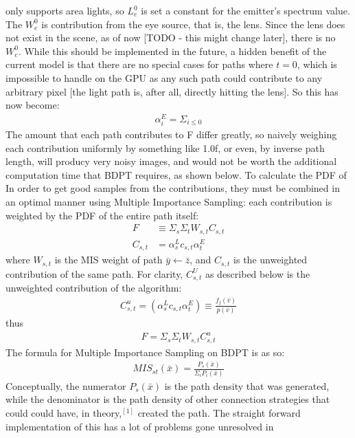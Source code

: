 \documentclass{article}
\begin{document}
only supports area lights, so $L^0_e$ is set a constant for the emitter's
spectrum value. The $W_e^0$ is contribution from the eye source, that is, the
lens. Since the lens does not exist in the scene, as of now [TODO - this might
change later], there is no $W_e^0$. While this should be implemented in the
future, a hidden benefit of the current model is that there are no special cases
for paths where $t = 0$, which is impossible to handle on the GPU as any such
path could contribute to any arbitrary pixel [the light path is, after all,
directly hitting the lens]. So this has now become:
  \begin{align}
    \alpha_i^E = \Sigma_{i\leq 0} 
  \end{align}
  The amount that each path contributes to F differ greatly, so naively weighing
each contribution uniformly by something like 1.0f, or even, by inverse path
length, will producy very noisy images, and would not be worth the additional
computation time that BDPT requires, as shown below. To calculate the PDF of In
order to get good samples from the contributions, they must be combined in an
optimal manner using Multiple Importance Sampling: each contribution is weighted
by the PDF of the entire path itself:
  \begin{align*}
    F &\equiv \Sigma_s\Sigma_tW_{s, t}C_{s, t}\\
    C_{s, t} &= \alpha^L_s c_{s, t} \alpha^E_t
  \end{align*}
    where $W_{s, t}$ is the MIS weight of path $\bar{y} \leftarrow \bar{z}$, and
$C_{s, t}$ is the unweighted contribution of the same path. For clarity,
$C^U_{s, t}$ as described below is the unweighted contribution of the
    algorithm:
  \begin{align}
    C^u_{s, t} = (\alpha^L_s c_{s, t} \alpha^E_t) \equiv
    \frac{f_j(\bar{v})}{p(\bar{v})}
  \end{align}
  thus
  \begin{align}
    F = \Sigma_s\Sigma_tW_{s, t}C^u_{s, t}
  \end{align}
    The formula for Multiple Importance Sampling on BDPT is as so:
  \begin{align}
    MIS_{st}(\bar{x}) = \frac{P_s(\bar{x})}{\Sigma_i{P_i(\bar{x})}} 
  \end{align}
    Conceptually, the numerator $P_s(\bar{x})$ is the path density that was
generated, while the denominator is the path density of other connection
strategies that could could have, in theory,$^{[1]}$ created the path. The
straight forward implementation of this has a lot of problems gone unresolved in
\end{document}
